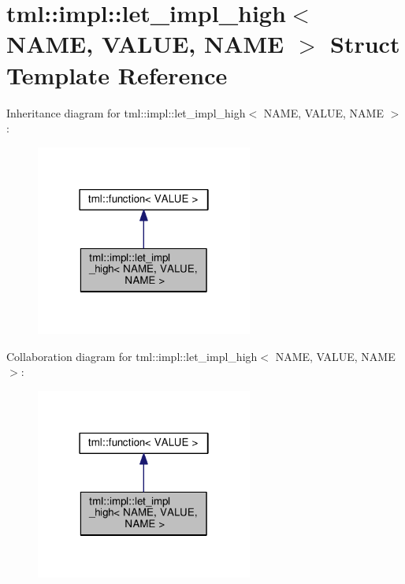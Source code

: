 \hypertarget{structtml_1_1impl_1_1let__impl__high_3_01_n_a_m_e_00_01_v_a_l_u_e_00_01_n_a_m_e_01_4}{\section{tml\+:\+:impl\+:\+:let\+\_\+impl\+\_\+high$<$ N\+A\+M\+E, V\+A\+L\+U\+E, N\+A\+M\+E $>$ Struct Template Reference}
\label{structtml_1_1impl_1_1let__impl__high_3_01_n_a_m_e_00_01_v_a_l_u_e_00_01_n_a_m_e_01_4}
}


Inheritance diagram for tml\+:\+:impl\+:\+:let\+\_\+impl\+\_\+high$<$ N\+A\+M\+E, V\+A\+L\+U\+E, N\+A\+M\+E $>$\+:
\nopagebreak
\begin{figure}[H]
\begin{center}
\leavevmode
\includegraphics[width=202pt]{structtml_1_1impl_1_1let__impl__high_3_01_n_a_m_e_00_01_v_a_l_u_e_00_01_n_a_m_e_01_4__inherit__graph}
\end{center}
\end{figure}


Collaboration diagram for tml\+:\+:impl\+:\+:let\+\_\+impl\+\_\+high$<$ N\+A\+M\+E, V\+A\+L\+U\+E, N\+A\+M\+E $>$\+:
\nopagebreak
\begin{figure}[H]
\begin{center}
\leavevmode
\includegraphics[width=202pt]{structtml_1_1impl_1_1let__impl__high_3_01_n_a_m_e_00_01_v_a_l_u_e_00_01_n_a_m_e_01_4__coll__graph}
\end{center}
\end{figure}
